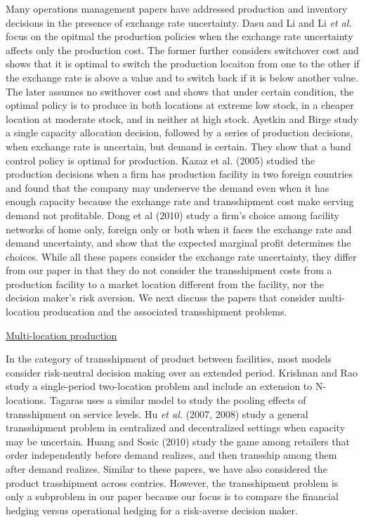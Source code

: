 \documentclass[mnsc,nonblindrev,copyedit]{informs2_wz} %
\begin{document}
Many operations management papers have addressed production and inventory decisions in the presence of exchange rate uncertainty.  Dasu and Li \cite{Dasu} and Li {\it et al.} \cite{Li2001} focus on the opitmal the production policies when the exchange rate uncertainty affects only the production cost.  The former further considers switchover cost and shows that it is optimal to switch the production locaiton from one to the other if the exchange rate is above a value and to switch back if it is below another value. The later assumes no swithover cost and shows that under certain condition, the optimal policy is to produce in both locations at extreme low stock, in a cheaper location at moderate stock, and in neither at high stock. Ayetkin and Birge \cite{Aytekin2004} study a single capacity allocation decision, followed by a series of production decisions, when exchange rate is uncertain, but demand is certain.  They show that a band control policy is optimal for production. Kazaz et al. (2005) studied the production decisions when a firm has production facility in two foreign countries and found that the company may underserve the demand even when it has enough capacity because the exchange rate and transshipment cost make serving demand not profitable. Dong et al (2010) study a firm's choice among facility networks of home only, foreign only or both when it faces the exchange rate and demand uncertainty, and show that the expected marginal profit determines the choices.  While all these papers consider the exchange rate uncertainty, they differ from our paper in that they do not consider the transshipment costs from a production facility to a market location different from the facility, nor the decision maker's risk aversion.  We next discuss the papers that consider multi-location producation and the associated transshipment problems. 



\noindent \underline{Multi-location production}

In the category of transshipment of product between facilities, most models consider risk-neutral decision making over an extended period.  Krishnan and Rao \cite{Krishnan1965} study a single-period two-location problem and include an extension to N-locations.  Tagaras \cite{Tagaras1992} uses a similar model to study the pooling effects of transshipment on service levels. Hu {\it et al.} (2007, 2008) study a general transshipment problem in centralized and decentralized settings when capacity may be uncertain. Huang and Sosic (2010) study the game among retailers that order independently before demand realizes, and then transship among them after demand realizes. Similar to these papers, we have also considered the product trasshipment across contries. However, the transshipment problem is only a subproblem in our paper because our focus is to compare the financial hedging versus operational hedging for a risk-averse decision maker. 
\end{document}
